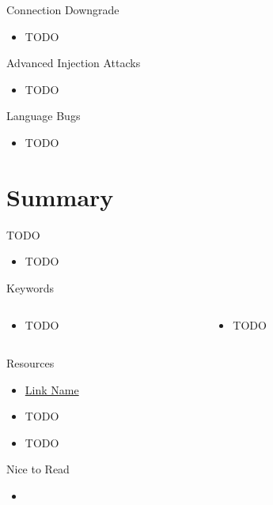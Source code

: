 \documentclass{curs}
\begin{document}
\begin{frame}{Connection Downgrade}
  \begin{itemize}
    \item TODO
  \end{itemize}
\end{frame}

\begin{frame}{Advanced Injection Attacks}
  \begin{itemize}
    \item TODO
  \end{itemize}
\end{frame}

\begin{frame}{Language Bugs}
  \begin{itemize}
    \item TODO
  \end{itemize}
\end{frame}

\section{Summary}

\begin{frame}{TODO}
  \begin{itemize}
    \item TODO
  \end{itemize}
\end{frame}

\begin{frame}{Keywords}
  \begin{columns}
    \begin{column}{0.5\textwidth}
      \begin{itemize}
        \item TODO
      \end{itemize}
    \end{column}
    \begin{column}{0.5\textwidth}
      \begin{itemize}
        \item TODO
      \end{itemize}
    \end{column}
  \end{columns}
\end{frame}

\begin{frame}{Resources}
  \begin{itemize}
    \item \href{https://link.url.com/}{Link Name}
    \item TODO
    \item TODO
  \end{itemize}
\end{frame}

\begin{frame}{Nice to Read}
  \begin{itemize}
    \item 
  \end{itemize}
\end{frame}
\end{document}
